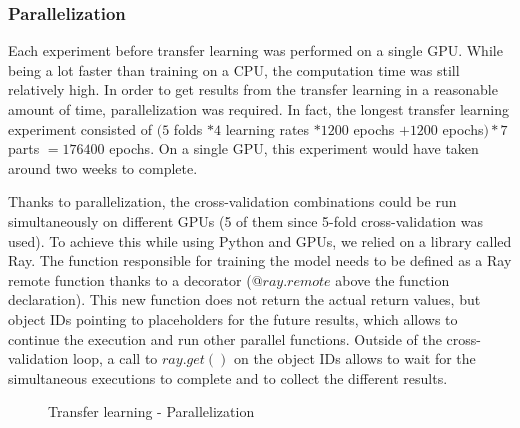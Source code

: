 \subsubsection{Parallelization}
Each experiment before transfer learning was performed on a single GPU. While being a lot faster than training on a CPU, the computation time was still relatively high. In order to get results from the transfer learning in a reasonable amount of time, parallelization was required. In fact, the longest transfer learning experiment consisted of $(5$ folds $* 4$ learning rates $* 1200$ epochs $+ 1200$ epochs$) * 7$ parts $= 176400$ epochs. On a single GPU, this experiment would have taken around two weeks to complete. 

Thanks to parallelization, the cross-validation combinations could be run simultaneously on different GPUs (5 of them since 5-fold cross-validation was used). To achieve this while using Python and GPUs, we relied on a library called Ray. The function responsible for training the model needs to be defined as a Ray remote function thanks to a decorator (@$ray.remote$ above the function declaration). This new function does not return the actual return values, but object IDs pointing to placeholders for the future results, which allows to continue the execution and run other parallel functions. Outside of the cross-validation loop, a call to $ray.get()$ on the object IDs allows to wait for the simultaneous executions to complete and to collect the different results. 

\begin{figure}[!h]
\centering
\noindent
{}
\caption{Transfer learning - Parallelization}
\label{fig:tl_parallel_run}
\end{figure}



